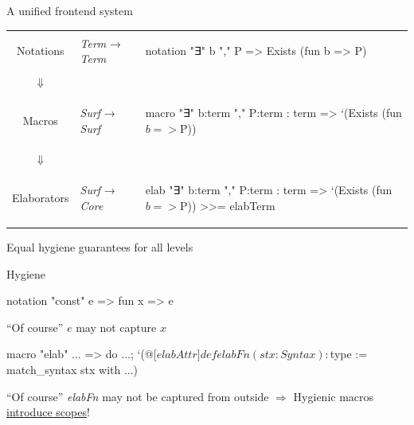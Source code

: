 \documentclass[t]{beamer}
\begin{document}
\begin{frame}[fragile]{A unified frontend system}
  \pause
  \vspace{0.5cm}
  \begin{tabular}{clp{9cm}}
    Notations & \emph{Term} → \emph{Term} & \vspace{-0.45cm}
\begin{leancode}
notation "∃" b "," P => Exists (fun b => P)
\end{leancode}
    \\
    \pause
    $\Downarrow$ &&\\
    Macros & \emph{Surf} → \emph{Surf} & \vspace{-0.45cm}
\begin{leancode}
macro "∃" b:term "," P:term : term =>
`(Exists (fun $b => $P))
\end{leancode}
    \\
    \pause
    $\Downarrow$ &&\\
    Elaborators & \emph{Surf} → \emph{Core} & \vspace{-0.45cm}
\begin{leancode}
elab "∃" b:term "," P:term : term =>
`(Exists (fun $b => $P)) >>= elabTerm
\end{leancode}
  \end{tabular}
  \pause
  Equal hygiene guarantees for all levels
\end{frame}

\begin{frame}{Hygiene}
\begin{leancode}
notation "const" e => fun x => e
\end{leancode}
  ``Of course'' $e$ may not capture $x$
  \pause
  \vfill
\begin{leancode}
macro "elab" ... => do
  ...;
  `(@[$elabAttr] def elabFn (stx : Syntax) : $type := match_syntax stx with ...)
\end{leancode}
  ``Of course'' \emph{elabFn} may not be captured from outside
  \pause
  \vfill
  $\Rightarrow$ Hygienic macros \underline{introduce scopes}!
\end{frame}
\end{document}
